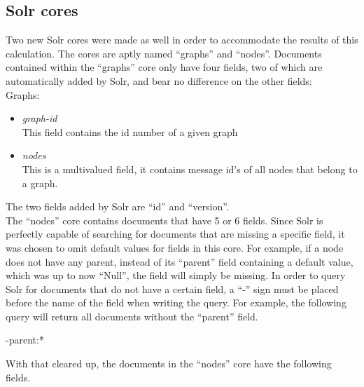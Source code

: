 \documentclass[a4paper,english]{report}
\begin{document}
\subsection{Solr cores}
Two new Solr cores were made as well in order to accommodate the results of this calculation. The cores are aptly named “graphs” and “nodes”. Documents contained within the “graphs” core only have four fields, two of which are automatically added by Solr, and bear no difference on the other fields:\\

Graphs:

\begin{itemize}
\item \emph{graph-id}\\
This field contains the id number of a given graph

\item \emph{nodes}\\
This is a multivalued field, it contains message id’s of all nodes that belong to a graph.\\


\end{itemize}

The two fields added by Solr are “id” and “version”.\\

The “nodes” core contains documents that have 5 or 6 fields. Since Solr is perfectly capable of searching for documents that are missing a specific field, it was chosen to omit default values for fields in this core. For example, if a node does not have any parent, instead of its “parent” field containing a default value, which was up to now “Null”, the field will simply be missing. 
In order to query Solr for documents that do not have a certain field, a “-” sign  must be placed before the name of the field when writing the query.
For example, the following query will return all documents without the “parent” field.\\ 

\begin{center}
-parent:*
\end{center}

With that cleared up, the documents in the “nodes” core have the following fields.
\end{document}
